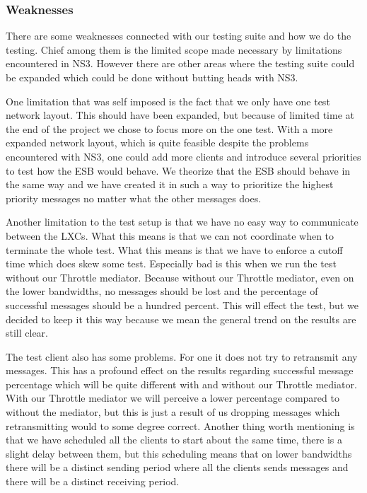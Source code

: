 \subsubsection{Weaknesses}\label{Testing:About:Weaknesses}
	There are some weaknesses connected with our testing suite and how we do the testing. Chief among them is the limited scope made necessary by limitations encountered in NS3. However there are other areas where the testing suite could be expanded which could be done without butting heads with NS3.
	
	One limitation that was self imposed is the fact that we only have one test network layout. This should have been expanded, but because of limited time at the end of the project we chose to focus more on the one test. With a more expanded network layout, which is quite feasible despite the problems encountered with NS3, one could add more clients and introduce several priorities to test how the ESB would behave. We theorize that the ESB should behave in the same way and we have created it in such a way to prioritize the highest priority messages no matter what the other messages does.
	
	Another limitation to the test setup is that we have no easy way to communicate between the LXCs. What this means is that we can not coordinate when to terminate the whole test. What this means is that we have to enforce a cutoff time which does skew some test. Especially bad is this when we run the test without our Throttle mediator. Because without our Throttle mediator, even on the lower bandwidths, no messages should be lost and the percentage of successful messages should be a hundred percent. This will effect the test, but we decided to keep it this way because we mean the general trend on the results are still clear.
	
	The test client also has some problems. For one it does not try to retransmit any messages. This has a profound effect on the results regarding successful message percentage which will be quite different with and without our Throttle mediator. With our Throttle mediator we will perceive a lower percentage compared to without the mediator, but this is just a result of us dropping messages which retransmitting would to some degree correct. Another thing worth mentioning is that we have scheduled all the clients to start about the same time, there is a slight delay between them, but this scheduling means that on lower bandwidths there will be a distinct sending period where all the clients sends messages and there will be a distinct receiving period.
	
